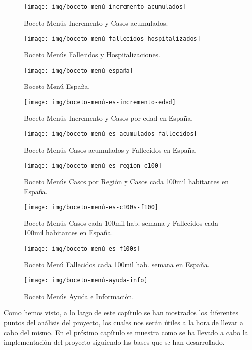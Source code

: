 \begin{figure}[p]
	\centering
	\texttt{[image: img/boceto-menú-incremento-acumulados]}
	\caption{Boceto Menús Incremento y Casos acumulados.}
	\label{fig:boceto4}
\end{figure}

\begin{figure}[p]
	\centering
	\texttt{[image: img/boceto-menú-fallecidos-hospitalizados]}
	\caption{Boceto Menús Fallecidos y Hospitalizaciones.}
	\label{fig:boceto5}
\end{figure}

\begin{figure}[p]
	\centering
	\texttt{[image: img/boceto-menú-españa]}
	\caption{Boceto Menú España.}
	\label{fig:boceto6}
\end{figure}

\begin{figure}[p]
	\centering
	\texttt{[image: img/boceto-menú-es-incremento-edad]}
	\caption{Boceto Menús Incremento y Casos por edad en España.}
	\label{fig:boceto7}
\end{figure}

\begin{figure}[p]
	\centering
	\texttt{[image: img/boceto-menú-es-acumulados-fallecidos]}
	\caption{Boceto Menús Casos acumulados y Fallecidos en España.}
	\label{fig:boceto8}
\end{figure}

\begin{figure}[p]
	\centering
	\texttt{[image: img/boceto-menú-es-region-c100]}
	\caption{Boceto Menús Casos por Región y Casos cada 100mil habitantes en España.}
	\label{fig:boceto9}
\end{figure}

\begin{figure}[p]
	\centering
	\texttt{[image: img/boceto-menú-es-c100s-f100]}
	\caption{Boceto Menús Casos cada 100mil hab. semana y Fallecidos cada 100mil habitantes en España.}
	\label{fig:boceto10}
\end{figure}

\begin{figure}[p]
	\centering
	\texttt{[image: img/boceto-menú-es-f100s]}
	\caption{Boceto Menú Fallecidos cada 100mil hab. semana en España.}
	\label{fig:boceto11}
\end{figure}

\begin{figure}[p]
	\centering
	\texttt{[image: img/boceto-menú-ayuda-info]}
	\caption{Boceto Menús Ayuda e Información.}
	\label{fig:boceto12}
\end{figure}

Como hemos visto, a lo largo de este capítulo se han mostrados los diferentes puntos del análisis del proyecto, los cuales nos serán útiles a la hora de llevar a cabo del mismo. En el próximo capítulo se muestra como se ha llevado a cabo la implementación del proyecto siguiendo las bases que se han desarrollado. 
